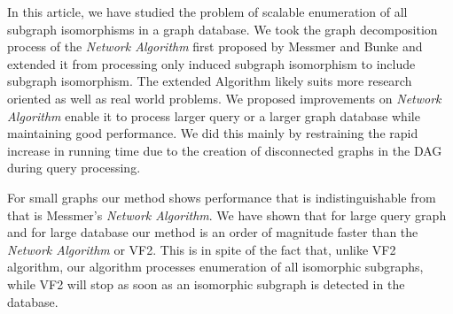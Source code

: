 In this article, we have studied the problem of scalable enumeration of all subgraph isomorphisms in a graph database. We took the graph decomposition process of the \textit{Network Algorithm} first proposed by  Messmer and Bunke \cite{messmer_bunke2000} and extended it from processing only induced subgraph isomorphism to include subgraph isomorphism. The extended Algorithm  likely suits more research oriented as well as real world  problems.
We proposed improvements on \textit{Network Algorithm} enable it to process larger query or a larger graph database while maintaining good performance.
We did this mainly by restraining the rapid increase in running time due to the creation of disconnected graphs in the DAG during query processing.

For small graphs our method shows performance that is indistinguishable from that is Messmer's \textit{Network Algorithm}. We have shown that for large
query graph and for large database our method is an order of magnitude faster than the \textit{Network Algorithm} or VF2. This is in spite of the fact that, unlike
VF2 algorithm, our algorithm processes enumeration of all isomorphic subgraphs, while VF2 will stop as soon as an isomorphic subgraph is detected in the database.


